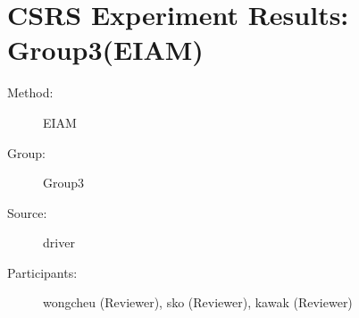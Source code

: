 \chapter {CSRS Experiment Results: Group3(EIAM)}	  
\small

\begin{description}
\item [Method:] EIAM
\item [Group:] Group3
\item [Source:] driver
\item [Participants:] wongcheu (Reviewer), sko (Reviewer), kawak (Reviewer)
\end{description}
